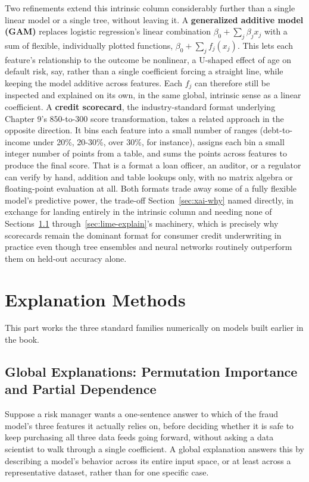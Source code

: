 \documentclass[../ai_in_finance]{subfiles}
\begin{document}
Two refinements extend this intrinsic column considerably further than a single linear model or a single tree, without leaving it. A \textbf{generalized additive model (GAM)} replaces logistic regression's linear combination $\beta_0 + \sum_j \beta_j x_j$ with a sum of flexible, individually plotted functions, $\beta_0 + \sum_j f_j(x_j)$. This lets each feature's relationship to the outcome be nonlinear, a U-shaped effect of age on default risk, say, rather than a single coefficient forcing a straight line, while keeping the model additive across features. Each $f_j$ can therefore still be inspected and explained on its own, in the same global, intrinsic sense as a linear coefficient. A \textbf{credit scorecard}, the industry-standard format underlying Chapter 9's $850$-to-$300$ score transformation, takes a related approach in the opposite direction. It bins each feature into a small number of ranges (debt-to-income under 20\%, 20-30\%, over 30\%, for instance), assigns each bin a small integer number of points from a table, and sums the points across features to produce the final score. That is a format a loan officer, an auditor, or a regulator can verify by hand, addition and table lookups only, with no matrix algebra or floating-point evaluation at all. Both formats trade away some of a fully flexible model's predictive power, the trade-off Section~\ref{sec:xai-why} named directly, in exchange for landing entirely in the intrinsic column and needing none of Sections~\ref{sec:global-explain} through~\ref{sec:lime-explain}'s machinery, which is precisely why scorecards remain the dominant format for consumer credit underwriting in practice even though tree ensembles and neural networks routinely outperform them on held-out accuracy alone.

\section{Explanation Methods}

This part works the three standard families numerically on models built earlier in the book.

\subsection{Global Explanations: Permutation Importance and Partial Dependence}
\label{sec:global-explain}

Suppose a risk manager wants a one-sentence answer to which of the fraud model's three features it actually relies on, before deciding whether it is safe to keep purchasing all three data feeds going forward, without asking a data scientist to walk through a single coefficient. A global explanation answers this by describing a model's behavior across its entire input space, or at least across a representative dataset, rather than for one specific case.
\end{document}
